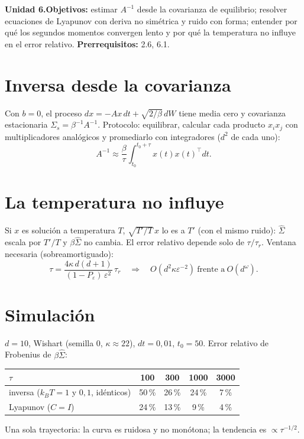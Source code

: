 \documentclass[11pt,a4paper]{article}
\begin{document}

\noindent\textbf{Unidad 6.}\quad\textbf{Objetivos:} estimar $A^{-1}$ desde la covarianza de equilibrio; resolver ecuaciones de Lyapunov con deriva no simétrica y ruido
con forma; entender por qué los segundos momentos convergen lento y por qué la temperatura no influye en el error relativo.
\textbf{Prerrequisitos:} 2.6, 6.1.

\section{Inversa desde la covarianza}
Con $b=0$, el proceso $dx=-Ax\,dt+\sqrt{2/\beta}\,dW$ tiene media cero y covarianza estacionaria $\Sigma_s=\beta^{-1}A^{-1}$. Protocolo: equilibrar, calcular
cada producto $x_ix_j$ con multiplicadores analógicos y promediarlo con integradores ($d^2$ de cada uno):
\[A^{-1}\approx\frac\beta\tau\int_{t_0}^{t_0+\tau}x(t)x(t)^\top dt.\]

\section{La temperatura no influye}
Si $x$ es solución a temperatura $T$, $\sqrt{T'/T}\,x$ lo es a $T'$ (con el mismo ruido): $\hat\Sigma$ escala por $T'/T$ y $\beta\hat\Sigma$ no cambia. El error
relativo depende solo de $\tau/\tau_r$. Ventana necesaria (sobreamortiguado):
\[\tau=\frac{4\kappa\,d(d+1)}{(1-P_\varepsilon)\,\varepsilon^2}\,\tau_r\quad\Rightarrow\quad O(d^2\kappa\varepsilon^{-2})\ \text{frente a}\ O(d^\omega).\]

\section{Simulación \evS}
$d=10$, Wishart (semilla 0, $\kappa\approx22$), $dt=0{,}01$, $t_0=50$. Error relativo de Frobenius de $\beta\hat\Sigma$:
\begin{center}\begin{tabular}{lcccc}\toprule
$\tau$ & 100 & 300 & 1000 & 3000\\\midrule
inversa ($k_BT=1$ y $0{,}1$, idénticos) & 50\,\% & 26\,\% & 24\,\% & 7\,\%\\
Lyapunov ($C=I$) & 24\,\% & 13\,\% & 9\,\% & 4\,\%\\\bottomrule\end{tabular}\end{center}
Una sola trayectoria: la curva es ruidosa y no monótona; la tendencia es $\propto\tau^{-1/2}$.
\end{document}
